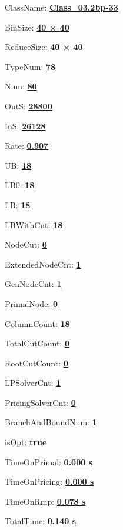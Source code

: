 \documentclass[11pt]{article}
\begin{document}
\pagestyle{empty}


ClassName: \underline{\textbf{Class_03.2bp-33}}
\par
BinSize: \underline{\textbf{40 × 40}}
\par
ReduceSize: \underline{\textbf{40 × 40}}
\par
TypeNum: \underline{\textbf{78}}
\par
Num: \underline{\textbf{80}}
\par
OutS: \underline{\textbf{28800}}
\par
InS: \underline{\textbf{26128}}
\par
Rate: \underline{\textbf{0.907}}
\par
UB: \underline{\textbf{18}}
\par
LB0: \underline{\textbf{18}}
\par
LB: \underline{\textbf{18}}
\par
LBWithCut: \underline{\textbf{18}}
\par
NodeCut: \underline{\textbf{0}}
\par
ExtendedNodeCnt: \underline{\textbf{1}}
\par
GenNodeCnt: \underline{\textbf{1}}
\par
PrimalNode: \underline{\textbf{0}}
\par
ColumnCount: \underline{\textbf{18}}
\par
TotalCutCount: \underline{\textbf{0}}
\par
RootCutCount: \underline{\textbf{0}}
\par
LPSolverCnt: \underline{\textbf{1}}
\par
PricingSolverCnt: \underline{\textbf{0}}
\par
BranchAndBoundNum: \underline{\textbf{1}}
\par
isOpt: \underline{\textbf{true}}
\par
TimeOnPrimal: \underline{\textbf{0.000 s}}
\par
TimeOnPricing: \underline{\textbf{0.000 s}}
\par
TimeOnRmp: \underline{\textbf{0.078 s}}
\par
TotalTime: \underline{\textbf{0.140 s}}
\par
\newpage


\end{document}
